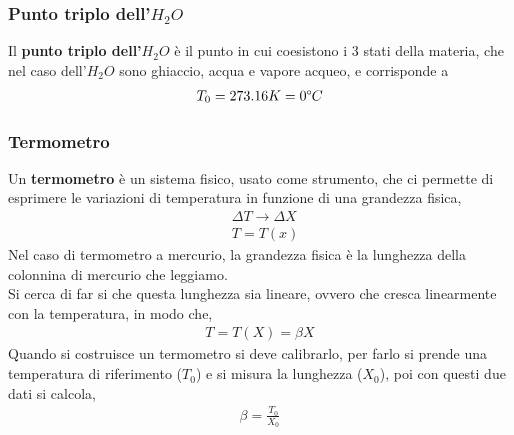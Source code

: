        \subsubsection{Punto triplo dell'$H_2O$}
            Il \textbf{punto triplo dell'$H_2O$} è il punto in cui coesistono i 3 stati della materia, che nel caso dell'$H_2O$ sono ghiaccio, acqua e vapore acqueo, e corrisponde a
            \begin{align*}
                T_0=273.16K=0\degree{}C
            \end{align*}

        \subsubsection{Termometro}
            Un \textbf{termometro} è un sistema fisico, usato come strumento, che ci permette di esprimere le variazioni di temperatura in funzione di una grandezza fisica,
            \begin{align*}
                &\Delta T\rightarrow\Delta X\\
                &T=T(x)
            \end{align*}
            Nel caso di termometro a mercurio, la grandezza fisica è la lunghezza della colonnina di mercurio che leggiamo.\\
            Si cerca di far si che questa lunghezza sia lineare, ovvero che cresca linearmente con la temperatura, in modo che,
            \begin{align*}
                T=T(X)=\beta X
            \end{align*}
            Quando si costruisce un termometro si deve calibrarlo, per farlo si prende una temperatura di riferimento ($T_0$) e si misura la lunghezza ($X_0$), poi con questi due dati si calcola,
            \begin{align*}
                \beta=\frac{T_0}{X_0}
            \end{align*}

